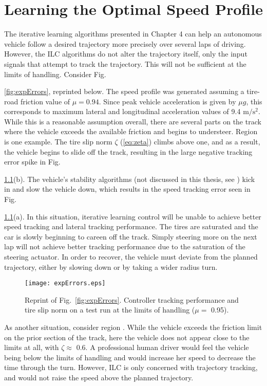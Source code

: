 \chapter{Learning the Optimal Speed Profile}
\label{chapter5}

The iterative learning algorithms presented in Chapter 4 can help an autonomous vehicle follow a desired trajectory more precisely over 
several laps of driving. However, the ILC algorithms do not alter the trajectory itself, only the input signals that attempt
to track the trajectory. This will not be sufficient at the limits of handling. 
Consider Fig.~{\ref{fig:expErrors}, reprinted below. The speed profile was generated assuming a tire-road friction value of $\mu = 0.94$.
Since peak vehicle acceleration is given by $\mu g$, this corresponds to maximum lateral and longitudinal acceleration values of 9.4 $\mathrm{m/s^2}$.
While this is a reasonable assumption overall, there are several parts on the track where the vehicle exceeds the available friction and begins
to understeer. Region  is one example. The tire slip norm $\zeta$ (\ref{eq:zeta}) climbs above one, and as a result, the vehicle begins
to slide off the track, resulting in the large negative tracking error spike in Fig.~{\ref{fig:expErrors2}(b). The vehicle's stability
algorithms (not discussed in this thesis, see \cite{mickthesis}) kick in and slow the vehicle down, which results in the speed tracking
error seen in Fig.~{\ref{fig:expErrors2}(a). In this situation, iterative learning control will be unable to achieve better speed tracking
and lateral tracking performance. The tires are saturated and the car is slowly beginning to careen off the track. Simply steering more
on the next lap will not achieve better tracking performance due to the saturation of the steering actuator. In order to recover, the vehicle must deviate
from the planned trajectory, either by slowing down or by taking a wider radius turn.
 
 \begin{figure}[h!]
\centering
\texttt{[image: expErrors.eps]}
\caption{Reprint of Fig.~\ref{fig:expErrors}. Controller tracking performance and tire slip norm on a test run at the limits of handling ($\mu =$ 0.95).}
\label{fig:expErrors2}
\end{figure}

\newpage
As another situation, consider region . While the vehicle exceeds the friction limit on the prior section of the track, 
here the vehicle does not appear close to the limits at all, with $\zeta \approx $ 0.6. A professional human driver would feel the vehicle being below the limits
of handling and would increase her speed to decrease the time through the turn. However, ILC is only concerned with trajectory tracking,
and would not raise the speed above the planned trajectory. 

}}}
